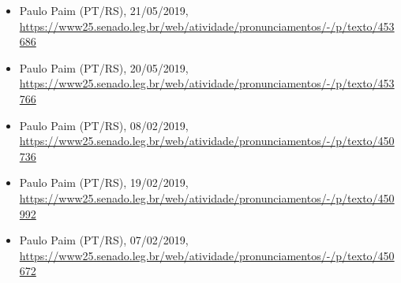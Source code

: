 \begin{itemize}
  \item Paulo Paim (PT/RS), 21/05/2019, \url{https://www25.senado.leg.br/web/atividade/pronunciamentos/-/p/texto/453686}
  \item Paulo Paim (PT/RS), 20/05/2019, \url{https://www25.senado.leg.br/web/atividade/pronunciamentos/-/p/texto/453766}
  \item Paulo Paim (PT/RS), 08/02/2019, \url{https://www25.senado.leg.br/web/atividade/pronunciamentos/-/p/texto/450736}
  \item Paulo Paim (PT/RS), 19/02/2019, \url{https://www25.senado.leg.br/web/atividade/pronunciamentos/-/p/texto/450992}
  \item Paulo Paim (PT/RS), 07/02/2019, \url{https://www25.senado.leg.br/web/atividade/pronunciamentos/-/p/texto/450672}
\end{itemize}

